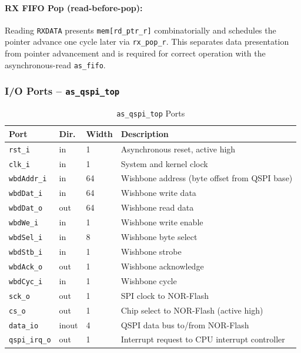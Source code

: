 \paragraph{RX FIFO Pop (read-before-pop):}
Reading \texttt{RXDATA} presents \texttt{mem[rd\_ptr\_r]} combinatorially and
schedules the pointer advance one cycle later via \texttt{rx\_pop\_r}. This
separates data presentation from pointer advancement and is required for
correct operation with the asynchronous-read \texttt{as\_fifo}.

\subsubsection{I/O Ports -- \texttt{as\_qspi\_top}}

\begin{table}[H]
\caption{\texttt{as\_qspi\_top} Ports}
\label{tab:asqspitop_ports}
\centering
\begin{tabularx}{\textwidth}{|l|l|l|X|}
  \hline
  Port & Dir. & Width & Description \\
  \hline\hline
  \texttt{rst\_i}       & in  & 1  & Asynchronous reset, active high \\
  \hline
  \texttt{clk\_i}       & in  & 1  & System and kernel clock \\
  \hline
  \texttt{wbdAddr\_i}   & in  & 64 & Wishbone address (byte offset from QSPI base) \\
  \hline
  \texttt{wbdDat\_i}    & in  & 64 & Wishbone write data \\
  \hline
  \texttt{wbdDat\_o}    & out & 64 & Wishbone read data \\
  \hline
  \texttt{wbdWe\_i}     & in  & 1  & Wishbone write enable \\
  \hline
  \texttt{wbdSel\_i}    & in  & 8  & Wishbone byte select \\
  \hline
  \texttt{wbdStb\_i}    & in  & 1  & Wishbone strobe \\
  \hline
  \texttt{wbdAck\_o}    & out & 1  & Wishbone acknowledge \\
  \hline
  \texttt{wbdCyc\_i}    & in  & 1  & Wishbone cycle \\
  \hline
  \texttt{sck\_o}       & out & 1  & SPI clock to NOR-Flash \\
  \hline
  \texttt{cs\_o}        & out & 1  & Chip select to NOR-Flash (active high) \\
  \hline
  \texttt{data\_io}     & inout & 4 & QSPI data bus to/from NOR-Flash \\
  \hline
  \texttt{qspi\_irq\_o} & out & 1  & Interrupt request to CPU interrupt controller \\
  \hline
\end{tabularx}
\end{table}

